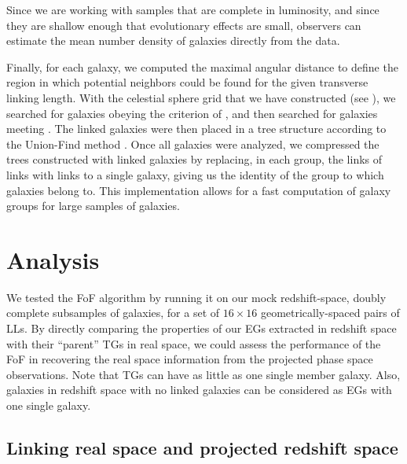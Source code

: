 Since we are working with samples that are complete in luminosity, and since
they are shallow enough that evolutionary effects are small, observers can
estimate the mean number density of galaxies directly from the data.

Finally, for each galaxy, we computed the maximal angular distance to define
the region in which potential neighbors could be found for the given transverse
linking length. With the  celestial sphere grid that we have constructed (see
), we searched for galaxies obeying the criterion of
, and then searched for galaxies meeting
. The linked galaxies were then placed in a tree
structure according to the Union-Find method \citep{Tarjan84}. Once all
galaxies were analyzed, we compressed the trees constructed with linked
galaxies by replacing, in each group, the links of links with links to a single
galaxy, giving us the identity of the group to which galaxies belong to. This
implementation allows for a fast computation of galaxy groups for large samples
of galaxies.

\section{Analysis}
\label{sec:fof_analysis}

We tested the FoF algorithm by running it on our mock redshift-space, doubly
complete subsamples of galaxies, for a set of $16\times16$ geometrically-spaced
pairs of LLs. By directly comparing the properties of our EGs extracted in
redshift space with their ``parent'' TGs in  real space, we could assess the
performance of the FoF in recovering the real space information from the
projected phase space observations. Note that TGs can have as little as one
single member galaxy. Also, galaxies in redshift space with no linked galaxies
can be considered as EGs with one single galaxy.

\subsection{Linking real space and projected redshift space}

